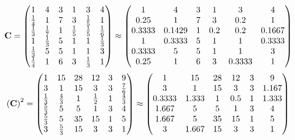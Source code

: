 \documentclass[10pt,a4paper]{article}
\begin{document}
	\[
		\bold{C} = 
		\begin{pmatrix}
			{1} {} & {{4}} {} & {{3}} {} & {1} {} & {{3}} {} & {{4}} {} \\
			\frac{1} {{4}} & {1} {} & {{7}} {} & {{3}} {} & \frac{1} {{5}} & {1} {} \\
			\frac{1} {{3}} & \frac{1} {{7}} & {1} {} & \frac{1} {{5}} & \frac{1} {{5}} & \frac{1} {{6}} \\
			{1} {} & \frac{1} {{3}} & {{5}} {} & {1} {} & {1} {} & \frac{1} {{3}} \\
			\frac{1} {{3}} & {{5}} {} & {{5}} {} & {1} {} & {1} {} & {{3}} {} \\
			\frac{1} {{4}} & {1} {} & {{6}} {} & {{3}} {} & \frac{1} {{3}} & {1} {} \\
		\end{pmatrix}
		\approx
		\begin{pmatrix}
			1        & 4        & 3        & 1        & 3        & 4        \\
			0.25     & 1        & 7        & 3        & 0.2      & 1        \\
			0.3333   & 0.1429   & 1        & 0.2      & 0.2      & 0.1667   \\
			1        & 0.3333   & 5        & 1        & 1        & 0.3333   \\
			0.3333   & 5        & 5        & 1        & 1        & 3        \\
			0.25     & 1        & 6        & 3        & 0.3333   & 1        \\
		\end{pmatrix}
	\]
	\[
		\left(\bold{C}\right)^{2} = 
		\begin{pmatrix}
			{1} {} & {{15}} {} & {{28}} {} & {{12}} {} & {{3}} {} & {{9}} {} \\
			{{3}} {} & {1} {} & {{15}} {} & {{3}} {} & {{3}} {} & \frac{{7}} {{6}} \\
			\frac{1} {{3}} & \frac{{4}} {{3}} & {1} {} & \frac{1} {{2}} & {1} {} & \frac{{4}} {{3}} \\
			\frac{{5}} {{3}} & {{5}} {} & {{5}} {} & {1} {} & {{3}} {} & {{4}} {} \\
			\frac{{5}} {{3}} & {{5}} {} & {{35}} {} & {{15}} {} & {1} {} & {{5}} {} \\
			{{3}} {} & \frac{{5}} {{3}} & {{15}} {} & {{3}} {} & {{3}} {} & {1} {} \\
		\end{pmatrix}
		\approx
		\begin{pmatrix}
			1        & 15       & 28       & 12       & 3        & 9        \\
			3        & 1        & 15       & 3        & 3        & 1.167    \\
			0.3333   & 1.333    & 1        & 0.5      & 1        & 1.333    \\
			1.667    & 5        & 5        & 1        & 3        & 4        \\
			1.667    & 5        & 35       & 15       & 1        & 5        \\
			3        & 1.667    & 15       & 3        & 3        & 1        \\
		\end{pmatrix}
	\]
\end{document}
